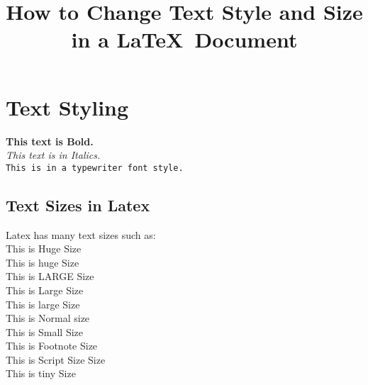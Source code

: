 \documentclass[draft, titlepage]{article}
\title{How to Change Text Style and Size in a \LaTeX\ Document}
\author{}
\date{}
\begin{document}
  \maketitle
		\section{Text Styling}
\textbf{This text is Bold.}\\
\textit{This text is in Italics.}\\
\texttt{This is in a typewriter font style.}\\

\subsection{Text Sizes in Latex}
		Latex has many text sizes such as:\\
{\Huge This is Huge Size}\\
{\huge This is huge Size}\\
{\LARGE This is LARGE Size}\\
{\Large This is Large Size}\\
{\large This is large Size}\\
{\normalsize This is Normal size}\\
{\small This is Small Size}\\
{\footnotesize This is Footnote Size}\\
{\scriptsize This is Script Size Size}\\
{\tiny This is tiny Size}\\
\end{document}
